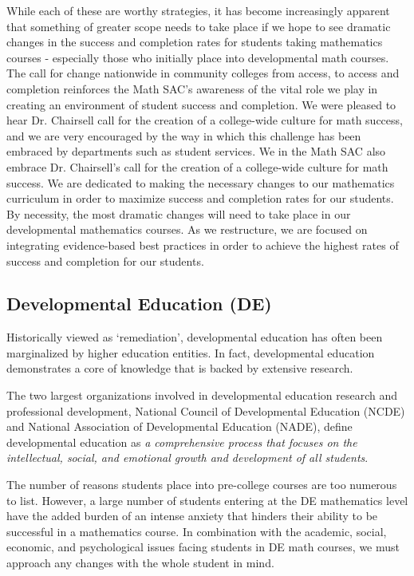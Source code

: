 While each of these are worthy strategies, it has become increasingly apparent
that something of greater scope needs to take place if we hope to see dramatic
changes in the success and completion rates for students taking mathematics
courses - especially those who initially place into developmental math courses.
The call for change nationwide in community colleges from access, to access and
completion reinforces the Math SAC's awareness of the vital role we play in
creating an environment of student success and completion.  We were pleased to
hear Dr. Chairsell call for the creation of a college-wide culture for math
success, and we are very encouraged by the way in which this challenge has been
embraced by departments such as student services.  We in the Math SAC also embrace
Dr. Chairsell's call for the creation of a college-wide culture for math
success. We are dedicated to making the necessary changes to our mathematics
curriculum in order to maximize success and completion rates for our students.
By necessity, the most dramatic changes will need to take place in our
developmental mathematics courses.  As we restructure, we are focused on
integrating evidence-based best practices in order to achieve the highest
rates of success and completion for our students. 

\subsection{Developmental Education (DE)}
Historically viewed as `remediation', developmental education has often
been marginalized by higher education entities.  In fact, developmental
education demonstrates a core of knowledge that is backed by extensive research.

The two largest organizations involved in developmental education research and
professional development, National Council of Developmental Education (NCDE) and
National Association of Developmental Education (NADE), define developmental
education as \emph{a comprehensive process that focuses on the intellectual,
social, and emotional growth and development of all students}.

The number of reasons students place into pre-college courses are too numerous
to list. However, a large number of students entering at the DE mathematics
level have the added burden of an intense anxiety that hinders their ability to
be successful in a mathematics course.  In combination with the academic,
social, economic, and psychological issues facing students in DE math courses,
we must approach any changes with the whole student in mind.

